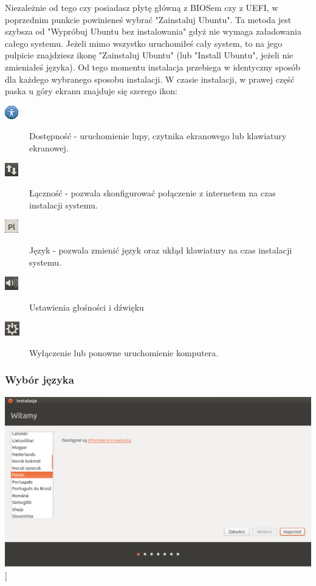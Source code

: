 Niezależnie od tego czy posiadasz płytę główną z BIOSem czy z UEFI, w poprzednim punkcie powinieneś wybrać "Zainstaluj Ubuntu". Ta metoda jest szybsza od "Wypróbuj Ubuntu bez instalowania" gdyż nie wymaga załadowania całego systemu. Jeżeli mimo wszystko uruchomiłeś cały system, to na jego pulpicie znajdziesz ikonę "Zainstaluj Ubuntu" (lub "Install Ubuntu", jeżeli nie zmieniałeś języka). Od tego momentu instalacja przebiega w identyczny sposób dla każdego wybranego sposobu instalacji.
W czasie instalacji, w prawej część paska u góry ekranu znajduje się szerego ikon:
\begin{description}
\item[\includegraphics{images/ikony_dostempnosc.png}]Dostępność - uruchomienie lupy, czytnika ekranowego lub klawiatury ekranowej.
\item[\includegraphics{images/ikony_internet.png}]Łączność - pozwala skonfigurować połączenie z internetem na czas instalacji systemu.
\item[\includegraphics{images/ikony_jezyk.png}]Język - pozwala zmienić język oraz ukłąd klawiatury na czas instalacji systemu.
\item[\includegraphics{images/ikony_dzwiek.png}]Ustawienia głośności i dźwięku
\item[\includegraphics{images/ikony_zasilanie.png}]Wyłączenie lub ponowne uruchomienie komputera.
\end{description}
\clearpage
\subsubsection{Wybór języka}
\begin{center}
        \includegraphics[scale=0.5]{images/instalator_jezyk.png}]
\end{center}

